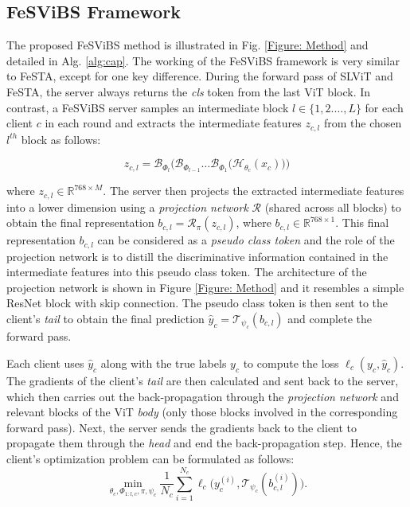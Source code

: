 \documentclass[runningheads]{llncs}
\begin{document}
\subsection{FeSViBS Framework}
The proposed FeSViBS method is illustrated in Fig. \ref{Figure: Method} and detailed in Alg. \ref{alg:cap}. The working of the FeSViBS framework is very similar to FeSTA, except for one key difference. During the forward pass of SLViT and FeSTA, the server always returns the \emph{cls} token from the last ViT block. In contrast, a FeSViBS server samples an intermediate block $l \in \{1,2.\dots,L\}$ for each client $c$ in each round and extracts the intermediate features $z_{c,l}$ from the chosen $l^{th}$ block as follows: 

\begin{equation}
    z_{c,l} = \mathbf{\mathcal{B}}_{\Phi_l} \Big( \mathbf{\mathcal{B}}_{\Phi_{l-1}} \dots \mathbf{\mathcal{B}}_{\Phi_{1}}\big(\mathbf{\mathcal{H}}_{\theta_c}(x_c)\big)\Big)
\end{equation}

\noindent where  $z_{c,l} \in \mathbb{R}^{768 \times M}$. The server then projects the extracted intermediate features into a lower dimension using a \emph{projection network} $\mathcal{R}$ (shared across all blocks) to obtain the final representation $b_{c,l} = \mathcal{R}_{\pi}(z_{c,l})$, where $b_{c,l} \in \mathbb{R}^{768 \times 1}$. This final representation $b_{c,l}$ can be considered as a \emph{pseudo class token} and the role of the projection network is to distill the discriminative information contained in the intermediate features into this pseudo class token. The architecture of the projection network is shown in Figure \ref{Figure: Method} and it resembles a simple ResNet \cite{ResNet} block with skip connection. The pseudo class token is then sent to the client's \emph{tail} to obtain the final prediction $\hat{y}_c = \mathcal{T}_{\psi_c} (b_{c,l})$ and complete the forward pass.

Each client uses $\hat{y}_c$ along with the true labels $y_c$ to compute the loss $\ell_c(y_c, \hat{y}_c)$. The gradients of the client's \emph{tail} are then calculated and sent back to the server, which then carries out the back-propagation through the \emph{projection network} and relevant blocks of the ViT \emph{body} (only those blocks involved in the corresponding forward pass). Next, the server sends the gradients back to the client to propagate them through the \emph{head} and end the back-propagation step. Hence, the client's optimization problem can be formulated as follows: 
\begin{equation}
\label{our_equation}
    \min_{\theta_c, \Phi_{1:l, c}, \pi, \psi_{c}} \frac{1}{N_c}\sum_{i=1}^{N_c} \ell_c \big( y_c^{(i)}, \mathbf{\mathcal{T}}_{\psi_c}(b_{c,l}^{(i)})\big).
\end{equation}
\end{document}
